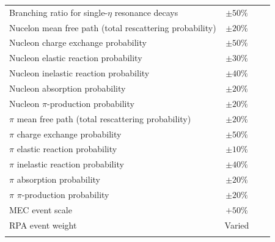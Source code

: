 \begin{longtable}{l c c c}
  Branching ratio for single-$\eta$ resonance decays & $\pm50\%$ & & \\
  Nucelon mean free path (total rescattering probability) & $\pm20\%$ & & \\
  Nucleon charge exchange probability & $\pm50\%$ & & \\
  Nucleon elastic reaction probability & $\pm30\%$ & & \\
  Nucleon inelastic reaction probability & $\pm40\%$ & & \\
  Nucleon absorption probability & $\pm20\%$ & & \\
  Nucleon $\pi$-production probability & $\pm20\%$ & & \\
  $\pi$ mean free path (total rescattering probability) & $\pm20\%$ & & \\
  $\pi$ charge exchange probability & $\pm50\%$ & & \\
  $\pi$ elastic reaction probability & $\pm10\%$ & & \\
  $\pi$ inelastic reaction probability & $\pm40\%$ & & \\
  $\pi$ absorption probability & $\pm20\%$ & & \\
  $\pi$ $\pi$-production probability & $\pm20\%$ & & \\
  MEC event scale & $+50\%$ & & \\
  RPA event weight & Varied & & \\
  \hline
  \label{tab:SystGENIE}
\end{longtable}
\doublespacing

